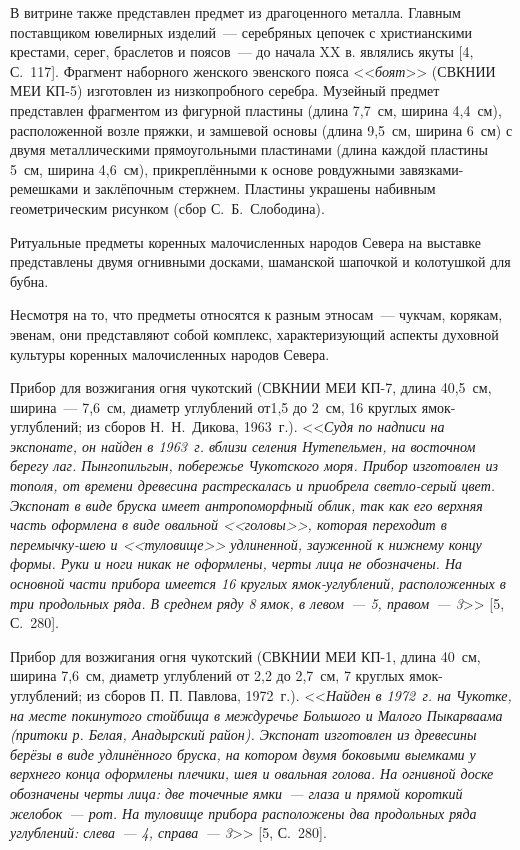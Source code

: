 В витрине также представлен предмет из драгоценного металла. Главным поставщиком ювелирных изделий~--- серебряных цепочек с христианскими крестами, серег, браслетов и поясов~--- до начала XX в. являлись якуты [4, С.~117]. Фрагмент наборного женского эвенского пояса <<\textit{боят}>> (СВКНИИ МЕИ КП-5) изготовлен из низкопробного серебра. Музейный предмет представлен фрагментом из фигурной пластины (длина 7,7~см, ширина 4,4~см), расположенной возле пряжки, и замшевой основы (длина 9,5~см, ширина 6~см) с двумя металлическими прямоугольными пластинами (длина каждой пластины 5~см, ширина 4,6~см), прикреплёнными к основе ровдужными завязками-ремешками и заклёпочным стержнем. Пластины украшены набивным геометрическим рисунком (сбор С.~Б.~Слободина).

Ритуальные предметы коренных малочисленных народов Севера на выставке представлены двумя огнивными досками, шаманской шапочкой и колотушкой для бубна.

Несмотря на то, что предметы относятся к разным этносам~--- чукчам, корякам, эвенам, они представляют собой комплекс, характеризующий аспекты духовной культуры коренных малочисленных народов Севера.

Прибор для возжигания огня чукотский (СВКНИИ МЕИ КП-7, длина 40,5~см, ширина~--- 7,6~см, диаметр углублений от1,5 до 2~см, 16 круглых ямок-углублений; из сборов Н.~Н.~Дикова, 1963~г.). <<\textit{Судя по надписи на экспонате, он найден в 1963~г. вблизи селения Нутепельмен, на восточном берегу лаг. Пынгопильгын, побережье Чукотского моря. Прибор изготовлен из тополя, от времени древесина растрескалась и приобрела светло-серый цвет. Экспонат в виде бруска имеет антропоморфный облик, так как его верхняя часть оформлена в виде овальной <<\textit{головы}>>, которая переходит в перемычку-шею и <<\textit{туловище}>> удлиненной, зауженной к нижнему концу формы. Руки и ноги никак не оформлены, черты лица не обозначены. На основной части прибора имеется 16 круглых ямок-углублений, расположенных в три продольных ряда. В среднем ряду 8 ямок, в левом~--- 5, правом~--- 3}>> [5, С.~280].

Прибор для возжигания огня чукотский (СВКНИИ МЕИ КП-1, длина 40~см, ширина 7,6~см, диаметр углублений от 2,2 до 2,7~см, 7 круглых ямок-углублений; из сборов П. П. Павлова, 1972~г.). <<\textit{Найден в 1972~г. на Чукотке, на месте покинутого стойбища в междуречье Большого и Малого Пыкарваама (притоки р. Белая, Анадырский район). Экспонат изготовлен из древесины берёзы в виде удлинённого бруска, на котором двумя боковыми выемками у верхнего конца оформлены плечики, шея и овальная голова. На огнивной доске обозначены черты лица: две точечные ямки~--- глаза и прямой короткий желобок~--- рот. На туловище прибора расположены два продольных ряда углублений: слева~--- 4, справа~--- 3}>> [5, С.~280].

